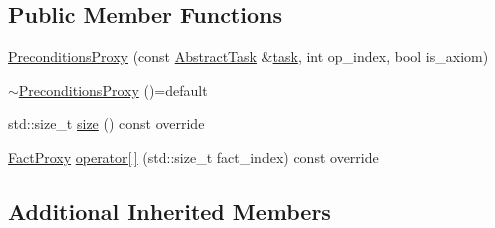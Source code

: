 \subsection*{Public Member Functions}
\begin{DoxyCompactItemize}
\item 
\hyperlink{classPreconditionsProxy_ac09e8e6e34d4e9fb7b850e34a65a30b0}{Preconditions\-Proxy} (const \hyperlink{classAbstractTask}{Abstract\-Task} \&\hyperlink{classConditionsProxy_a8e8c904bd5dc370a7239ec7495dc0dfe}{task}, int op\-\_\-index, bool is\-\_\-axiom)
\item 
\hyperlink{classPreconditionsProxy_a7c850b678c7f2ce9bdc5758ddbbd666a}{$\sim$\-Preconditions\-Proxy} ()=default
\item 
std\-::size\-\_\-t \hyperlink{classPreconditionsProxy_a63cac56561ada0b576cff8f732a3a902}{size} () const override
\item 
\hyperlink{classFactProxy}{Fact\-Proxy} \hyperlink{classPreconditionsProxy_ae350b0dfab627206414f3dc3a8a819ce}{operator\mbox{[}$\,$\mbox{]}} (std\-::size\-\_\-t fact\-\_\-index) const override
\end{DoxyCompactItemize}
\subsection*{Additional Inherited Members}


